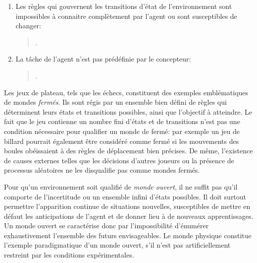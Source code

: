 \begin{enumerate}
	\item Les règles qui gouvernent les transitions d'état de l'environnement sont impossibles à connaitre complètement par l'agent ou sont susceptibles de changer: 
\begin{quote}
	 \cite[p.~3]{xu_what_2024}.
\end{quote}

	\item  La tâche de l'agent n'est pas prédéfinie par le concepteur:  
\begin{quote}
	\cite[p.~3]{xu_what_2024}.
\end{quote}

\end{enumerate}


Les jeux de plateau, tels que les échecs, constituent des exemples emblématiques de mondes \emph{fermés}. 
Ils sont régis par un ensemble bien défini de règles qui déterminent leurs états et transitions possibles, ainsi que l'objectif à atteindre. 
Le fait que le jeu contienne un nombre fini d'états et de transitions n'est pas une condition nécessaire pour qualifier un monde de fermé: 
par exemple un jeu de billard pourrait également être considéré comme fermé si les mouvements des boules obéissaient à des règles de déplacement bien précises. 
De même, l'existence de causes externes telles que les décisions d'autres joueurs ou la présence de processus aléatoires ne les disqualifie pas comme mondes fermés. 
 
Pour qu’un environnement soit qualifié de \emph{monde ouvert}, il ne suffit pas qu’il comporte de l’incertitude ou un ensemble infini d’états possibles. 
Il doit surtout permettre l’apparition continue de situations nouvelles, susceptibles de mettre en défaut les anticipations de l'agent et de donner lieu à de nouveaux apprentissages. 
Un monde ouvert se caractérise donc par l’impossibilité d’énumérer exhaustivement l’ensemble des futurs envisageables.
Le monde physique constitue l'exemple paradigmatique d'un monde ouvert, s'il n'est pas artificiellement restreint par les conditions expérimentales.

